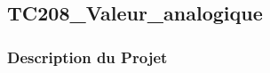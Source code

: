 \documentclass[a4paper,12pt]{report}
\begin{document}
\subsection{TC208\_Valeur\_analogique}
\begin{center}
\label{}
\end{center}
\subsubsection{Description du Projet}
\end{document}
